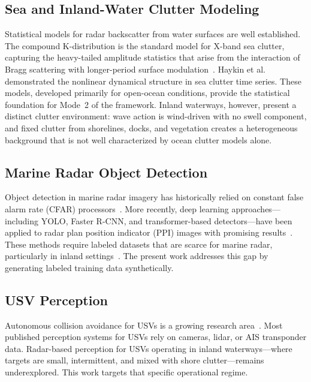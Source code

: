 \documentclass[twocolumn, 10pt]{article}
\begin{document}
\subsection{Sea and Inland-Water Clutter Modeling}

Statistical models for radar backscatter from water surfaces are well established. The compound K-distribution is the standard model for X-band sea clutter, capturing the heavy-tailed amplitude statistics that arise from the interaction of Bragg scattering with longer-period surface modulation~\cite{ward2013sea, watts1987radar, farina1997high}. Haykin et al.~\cite{haykin2002uncovering} demonstrated the nonlinear dynamical structure in sea clutter time series. These models, developed primarily for open-ocean conditions, provide the statistical foundation for Mode~2 of the framework. Inland waterways, however, present a distinct clutter environment: wave action is wind-driven with no swell component, and fixed clutter from shorelines, docks, and vegetation creates a heterogeneous background that is not well characterized by ocean clutter models alone.

\subsection{Marine Radar Object Detection}

Object detection in marine radar imagery has historically relied on constant false alarm rate (CFAR) processors~\cite{rohling1983radar, gandhi1988analysis}. More recently, deep learning approaches---including YOLO, Faster R-CNN, and transformer-based detectors---have been applied to radar plan position indicator (PPI) images with promising results~\cite{prasad2017object}. These methods require labeled datasets that are scarce for marine radar, particularly in inland settings~\cite{cheng2021robust}. The present work addresses this gap by generating labeled training data synthetically.

\subsection{USV Perception}

Autonomous collision avoidance for USVs is a growing research area~\cite{han2023maritime}. Most published perception systems for USVs rely on cameras, lidar, or AIS transponder data. Radar-based perception for USVs operating in inland waterways---where targets are small, intermittent, and mixed with shore clutter---remains underexplored. This work targets that specific operational regime.
\end{document}
